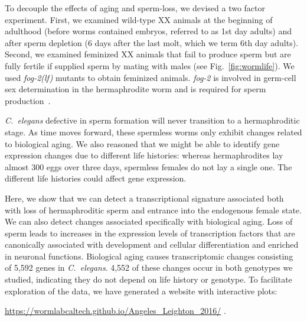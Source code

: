 \documentclass[10pt,letterpaper,twocolumn]{article}
\newcommand{\cel}{\emph{C.~elegans}}
\newcommand{\fog}{\emph{\mbox{fog-2(lf)}}}
\newcommand{\gene}[1]{\emph{\mbox{#1}}}
\newcommand{\agen}{5,592}
\newcommand{\website}{
            \url{https://wormlabcaltech.github.io/Angeles_Leighton_2016/}
            }
\begin{document}
To decouple the effects of aging and sperm-loss, we devised a two factor
experiment. First, we examined wild-type XX animals at the beginning of
adulthood (before worms contained embryos, referred to as 1st day adults) and
after sperm depletion (6 days after the last molt, which we term 6th day
adults). Second, we examined feminized XX animals that fail to produce sperm but
are fully fertile if supplied sperm by mating with males (see
Fig.~\ref{fig:wormlife}). We used \fog{} mutants to obtain feminized animals.
\gene{fog-2} is involved in germ-cell sex determination in the hermaphrodite
worm and is required for sperm production~\cite{Schedl1988,Clifford2000}.

\cel{} defective in sperm formation will never transition to a hermaphroditic
stage. As time moves forward, these spermless worms only exhibit changes
related to biological aging. We also reasoned that we might be able to identify
gene expression changes due to different life histories: whereas hermaphrodites
lay almost 300 eggs over three days, spermless females do not lay a single one.
The different life histories could affect gene expression.

Here, we show that we can detect a transcriptional signature associated both
with loss of hermaphroditic sperm and entrance into the endogenous female state.
We can also detect changes associated specifically with biological aging.
Loss of sperm leads to increases in the expression levels of transcription
factors that are canonically associated with development and cellular
differentiation and enriched in neuronal functions.
Biological aging causes transcriptomic changes consisting of \agen{} genes
in \cel{}. 4,552 of these changes occur in both genotypes we studied,
indicating they do not depend on life history or genotype. To facilitate
exploration of the data, we have generated a website with interactive plots:
\website{}.
\end{document}
